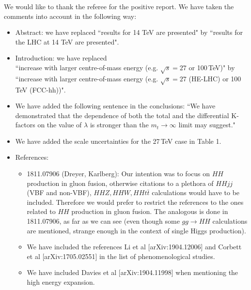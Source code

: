\documentclass[]{article}
\begin{document}
We would like to thank the referee for the positive report.
We have taken the comments into account in the following way:

\begin{itemize}
\item  Abstract: we have replaced ``results for 14 TeV are presented" by ``results for the LHC at 14 TeV are presented".

\item Introduction: we have replaced\\
 ``increase with larger centre-of-mass energy (e.g. $\sqrt{s}=27$ or 100\,TeV)" by \\
``increase with larger centre-of-mass energy (e.g. $\sqrt{s}=27$ (HE-LHC) or 100\,TeV (FCC-hh))".

\item We have added the following sentence in the conclusions:
``We have demonstrated that the dependence of both the total and the
differential K-factors on the value of $\lambda$ is stronger than the $m_t\to\infty$ limit may suggest."

\item We have added the scale uncertainties for the 27\,TeV case in Table 1.

\item References: 
\begin{itemize}
\item 1811.07906 (Dreyer, Karlberg): 
Our intention was to focus on $HH$ production in gluon fusion, otherwise citations to a plethora of
$HHjj$ (VBF and non-VBF), $HHZ,HHW, HHt\bar{t}$ calculations would have to be included.  
Therefore we would prefer to restrict the references to the ones
related to $HH$ production in gluon fusion.
The analogous is done in 1811.07906, as far as we can see (even though
some $gg\to HH$ calculations are mentioned, strange enough in the context of
single Higgs production). 

\item We have included the references Li et al [arXiv:1904.12006] and Corbett et al [arXiv:1705.02551] in the list of phenomenological studies.

\item We have included Davies et al [arXiv:1904.11998] when mentioning the high energy expansion.
\end{itemize}

\end{itemize}
\end{document}
